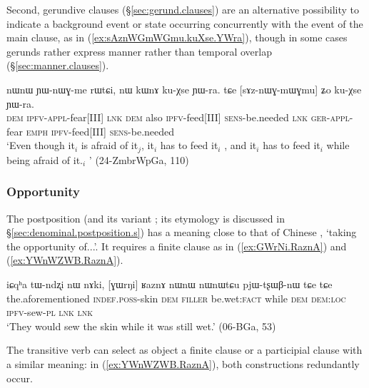 Second, gerundive clauses (§\ref{sec:gerund.clauses}) are an alternative possibility to indicate a background event or state occurring concurrently with the event of the main clause, as in (\ref{ex:sAznWGmWGmu.kuXse.YWra}), though in some cases gerunds rather express manner rather than temporal overlap (§\ref{sec:manner.clauses}).
 
\begin{exe}
\ex \label{ex:sAznWGmWGmu.kuXse.YWra}
\gll nɯnɯ ɲɯ-nɯɣ-me rɯtɕi, nɯ kɯnɤ ku-χse ɲɯ-ra.  tɕe [sɤz-nɯɣ-mɯ\redp{}ɣmu] ʑo ku-χse ɲɯ-ra. \\
\textsc{dem} \textsc{ipfv}-\textsc{appl}-fear[III] \textsc{lnk} \textsc{dem} also \textsc{ipfv}-feed[III] \textsc{sens}-be.needed \textsc{lnk} \textsc{ger}-\textsc{appl}-fear \textsc{emph} \textsc{ipfv}-feed[III]  \textsc{sens}-be.needed \\
\glt `Even though it$_i$ is afraid of it$_j$, it$_i$ has to feed it$_i$ , and it$_i$ has to feed it$_i$  while being afraid of it.$_i$ '  (24-ZmbrWpGa, 110)
\end{exe}

 

\subsubsection{Opportunity} \label{sec:RaznA}
The postposition  (and its variant ; its etymology is discussed in §\ref{sec:denominal.postposition.s}) has a meaning close to that of Chinese , `taking the opportunity of...'. It requires a finite clause as in (\ref{ex:GWrNi.RaznA}) and (\ref{ex:YWnWZWB.RaznA}).

\begin{exe}
\ex \label{ex:GWrNi.RaznA}
\gll iɕqʰa tɯ-ndʐi nɯ nɤki, [ɣɯrŋi] ʁaznɤ nɯnɯ nɯnɯtɕu pjɯ-tʂɯβ-nɯ tɕe tɕe \\
the.aforementioned \textsc{indef}.\textsc{poss}-skin \textsc{dem} \textsc{filler} be.wet:\textsc{fact} while \textsc{dem} \textsc{dem}:\textsc{loc} \textsc{ipfv}-sew-\textsc{pl} \textsc{lnk} \textsc{lnk} \\
\glt `They would sew the skin while it was still wet.' (06-BGa, 53)
\end{exe}

The transitive verb  can select as object a finite clause or a participial clause with a similar meaning: in  (\ref{ex:YWnWZWB.RaznA}), both constructions redundantly occur. 

